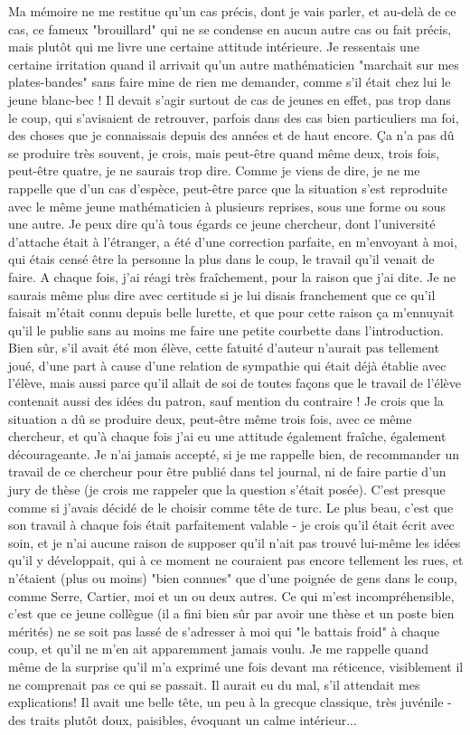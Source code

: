 Ma mémoire ne me restitue qu'un cas précis, dont je vais parler, et au-delà de ce cas, ce fameux "brouillard" qui ne se condense en aucun autre cas ou fait précis, mais plutôt qui me livre une certaine attitude intérieure. Je ressentais une certaine irritation quand il arrivait qu'un autre mathématicien "marchait sur mes plates-bandes" sans faire mine de rien me demander, comme s'il était chez lui le jeune blanc-bec ! Il devait s'agir surtout de cas de jeunes en effet, pas trop dans le coup, qui s'avisaient de retrouver, parfois dans des cas bien particuliers ma foi, des choses que je connaissais depuis des années et de haut encore. Ça n'a pas dû se produire très souvent, je crois, mais peut-être quand même deux, trois fois, peut-être quatre, je ne saurais trop dire. Comme je viens de dire, je ne me rappelle que d'un cas d'espèce, peut-être parce que la situation s'est reproduite avec le même jeune mathématicien à plusieurs reprises, sous une forme ou sous une autre. Je peux dire qu'à tous égards ce jeune chercheur, dont l'université d'attache était à l'étranger, a été d'une correction parfaite, en m'envoyant à moi, qui étais censé être la personne la plus dans le coup, le travail qu'il venait de faire. A chaque fois, j'ai réagi très fraîchement, pour la raison que j'ai dite. Je ne saurais même plus dire avec certitude si je lui disais franchement que ce qu'il faisait m'était connu depuis belle lurette, et que pour cette raison ça m'ennuyait qu'il le publie sans au moins me faire une petite courbette dans l'introduction. Bien sûr, s'il avait été mon élève, cette fatuité d'auteur n'aurait pas tellement joué, d'une part à cause d'une relation de sympathie qui était déjà établie avec l'élève, mais aussi parce qu'il allait de soi de toutes façons que le travail de l'élève contenait aussi des idées du patron, sauf mention du contraire ! Je crois que la situation a dû se produire deux, peut-être même trois fois, avec ce même chercheur, et qu'à chaque fois j'ai eu une attitude également fraîche, également décourageante. Je n'ai jamais accepté, si je me rappelle bien, de recommander un travail de ce chercheur pour être publié dans tel journal, ni de faire partie d'un jury de thèse (je crois me rappeler que la question s'était posée). C'est presque comme si j'avais décidé de le choisir comme tête de turc. Le plus beau, c'est que son travail à chaque fois était parfaitement valable - je crois qu'il était écrit avec soin, et je n'ai aucune raison de supposer qu'il n'ait pas trouvé lui-même les idées qu'il y développait, qui à ce moment ne couraient pas encore tellement les rues, et n'étaient (plus ou moins) "bien connues" que d'une poignée de gens dans le coup, comme Serre, Cartier, moi et un ou deux autres. Ce qui m'est incompréhensible, c'est que ce jeune collègue (il a fini bien sûr par avoir une thèse et un poste bien mérités) ne se soit pas lassé de s'adresser à moi qui "le battais froid" à chaque coup, et qu'il ne m'en ait apparemment jamais voulu. Je me rappelle quand même de la surprise qu'il m'a exprimé une fois devant ma réticence, visiblement il ne comprenait pas ce qui se passait. Il aurait eu du mal, s'il attendait mes explications! Il avait une belle tête, un peu à la grecque classique, très juvénile - des traits plutôt doux, paisibles, évoquant un calme intérieur... 